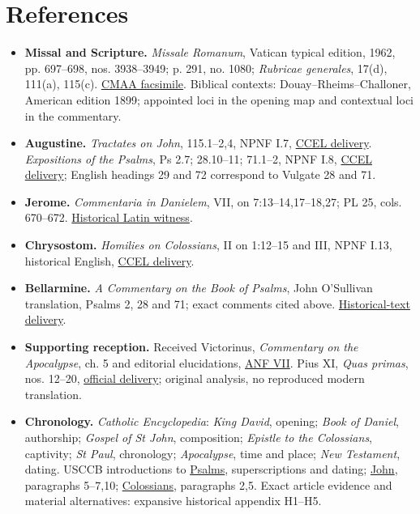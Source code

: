 \section{References}
\begin{itemize}[leftmargin=1.2em,itemsep=.35em]
\item \textbf{Missal and Scripture.} \emph{Missale Romanum}, Vatican typical edition, 1962, pp. 697--698, nos. 3938--3949; p. 291, no. 1080; \emph{Rubricae generales}, 17(d), 111(a), 115(c). \href{https://media.churchmusicassociation.org/pdf/missale62.pdf}{CMAA facsimile}. Biblical contexts: Douay--Rheims--Challoner, American edition 1899; appointed loci in the opening map and contextual loci in the commentary.
\item \textbf{Augustine.} \emph{Tractates on John}, 115.1--2,4, NPNF I.7, \href{https://www.ccel.org/ccel/schaff/npnf107.html}{CCEL delivery}. \emph{Expositions of the Psalms}, Ps 2.7; 28.10--11; 71.1--2, NPNF I.8, \href{https://www.ccel.org/ccel/schaff/npnf108.html}{CCEL delivery}; English headings 29 and 72 correspond to Vulgate 28 and 71.
\item \textbf{Jerome.} \emph{Commentaria in Danielem}, VII, on 7:13--14,17--18,27; PL 25, cols. 670--672. \href{https://la.wikisource.org/wiki/Commentaria_in_Danielem_(Hieronymus)}{Historical Latin witness}.
\item \textbf{Chrysostom.} \emph{Homilies on Colossians}, II on 1:12--15 and III, NPNF I.13, historical English, \href{https://www.ccel.org/ccel/schaff/npnf113.html}{CCEL delivery}.
\item \textbf{Bellarmine.} \emph{A Commentary on the Book of Psalms}, John O'Sullivan translation, Psalms 2, 28 and 71; exact comments cited above. \href{https://www.ecatholic2000.com/bellarmine/commentary-on-psalms.shtml}{Historical-text delivery}.
\item \textbf{Supporting reception.} Received Victorinus, \emph{Commentary on the Apocalypse}, ch. 5 and editorial elucidations, \href{https://www.ccel.org/ccel/schaff/anf07.html}{ANF VII}. Pius XI, \emph{Quas primas}, nos. 12--20, \href{https://www.vatican.va/content/pius-xi/en/encyclicals/documents/hf_p-xi_enc_11121925_quas-primas.html}{official delivery}; original analysis, no reproduced modern translation.
\item \textbf{Chronology.} \emph{Catholic Encyclopedia}: \emph{King David}, opening; \emph{Book of Daniel}, authorship; \emph{Gospel of St John}, composition; \emph{Epistle to the Colossians}, captivity; \emph{St Paul}, chronology; \emph{Apocalypse}, time and place; \emph{New Testament}, dating. USCCB introductions to \href{https://bible.usccb.org/bible/psalms/0}{Psalms}, superscriptions and dating; \href{https://bible.usccb.org/bible/john/0}{John}, paragraphs 5--7,10; \href{https://bible.usccb.org/bible/colossians/0?bk=Colossians&ch=}{Colossians}, paragraphs 2,5. Exact article evidence and material alternatives: expansive historical appendix H1--H5.
\end{itemize}
